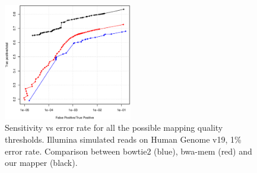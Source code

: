 \begin{figure}[h]
	\begin{minipage}[b]{\linewidth}
	  \centering
	  \includegraphics[width=0.5\textwidth]{figures/chap4_hg_5_15}
	  \caption{Sensitivity vs error rate for all the possible mapping
       quality thresholds. Illumina simulated reads on Human Genome
       v19, 1\% error rate. Comparison between bowtie2 (blue), bwa-mem
       (red) and our mapper (black). }
	  \label{fig:chap4:hg515}
   \end{minipage}
\end{figure}
